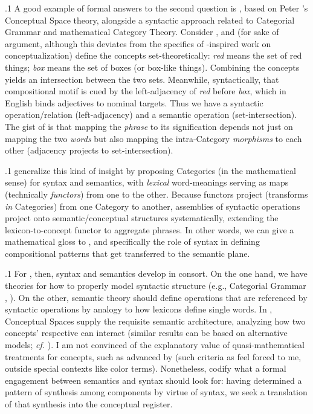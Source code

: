 \documentclass[11pt, twocolumn]{article}
\begin{document}
{{\p.1{%
A good example of formal answers to the second question is
\Boltetal{} , based on Peter \Gardenfors{}'s Conceptual Space
theory, alongside a syntactic approach related to Categorial Grammar
and mathematical Category Theory. Consider , and
(for sake of argument, although this deviates from the
specifics of \Gardenfors{}-inspired work on conceptualization)
define the concepts set-theoretically:
\textit{red} means the set of red things; \textit{box} means the set of
boxes (or box-like things). Combining the concepts yields
an intersection between the two sets. Meanwhile,
syntactically, that compositional motif is cued by the left-adjacency of
\textit{red} before \textit{box}, which in English binds
adjectives to nominal targets. Thus we have a
syntactic operation/relation (left-adjacency) and a
semantic operation (set-intersection). The gist
of  is that mapping the \textit{phrase} to its signification
depends not just on mapping the two \textit{words} but also
mapping the intra-Category \textit{morphisms} to each other (adjacency
projects to set-intersection).
}%

\p.1{%
\Boltetal{} generalize this kind of insight by proposing
Categories (in the mathematical sense) for syntax and semantics,
with \textit{lexical} word-meanings serving as maps (technically
\textit{functors}) from one to the other. Because functors
project  (transforms \textit{in} Categories) from one Category
to another, assemblies of syntactic operations
project onto semantic/conceptual structures systematically,
extending the lexicon-to-concept functor to aggregate
phrases. In other words, we can give a mathematical gloss
to , and specifically the role of
syntax in defining compositional patterns that get transferred
to the semantic plane.
}%

\p.1{%
For \Boltetal{}, then, syntax and semantics develop in consort. On the
one hand, we have theories for how to properly model syntactic
structure (e.g., Categorial Grammar , ). On the other, semantic theory
should define operations that are referenced by syntactic operations
by analogy to how lexicons define single words. In , Conceptual Spaces
supply the requisite semantic architecture, analyzing how
two concepts' respective  can interact (similar
results can be based on alternative 
models; \textit{cf.} ).
I am not convinced of the explanatory value of
quasi-mathematical treatments for concepts, such as
advanced by \Gardenfors{} (such criteria as 
feel forced to me, outside special contexts like color terms).
Nonetheless, \Boltetal{} codify what a formal engagement
between semantics and syntax should look for: having determined
a pattern of synthesis among components by
virtue of syntax, we seek a translation of that
synthesis into the conceptual register.
}%

}}
\end{document}
